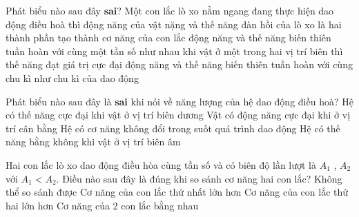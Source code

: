\begin{ex}%
Phát biểu nào sau đây \textbf{sai}? Một con lắc lò xo nằm ngang đang thực hiện dao động điều hoà thì
\choice
{động năng của vật nặng và thế năng đàn hồi của lò xo là hai thành phần tạo thành cơ năng của con lắc}
{động năng và thế năng biến thiên tuần hoàn với cùng một tần số như nhau}
{khi vật ở một trong hai vị trí biên thì thế năng đạt giá trị cực đại}
{\True động năng và thế năng biến thiên tuần hoàn với cùng chu kì như chu kì của dao động}
\loigiai{

}
\end{ex} 
\begin{ex}%
Phát biểu nào sau đây là \textbf{sai} khi nói về năng lượng của hệ dao động điều hoà?
\choice
{Hệ có thế năng cực đại khi vật ở vị trí biên dương}
{Vật có động năng cực đại khi ở vị trí cân bằng}
{Hệ có cơ năng không đổi trong suốt quá trình dao động}
{\True Hệ có thế năng bằng không khi vật ở vị trí biên âm}
\end{ex} 

\begin{ex}%
Hai con lắc lò xo dao động điều hòa cùng tần số và có biên độ lần lượt là $A_1$ , $A_2$ với $A_1<A_2$. Điều nào sau đây là đúng khi so sánh cơ năng hai con lắc?
\choice
{\True Không thể so sánh được}
{Cơ năng của con lắc thứ nhất lớn hơn}
{Cơ năng của con lắc thứ hai lớn hơn}
{Cơ năng của 2 con lắc bằng nhau}
\end{ex} 

